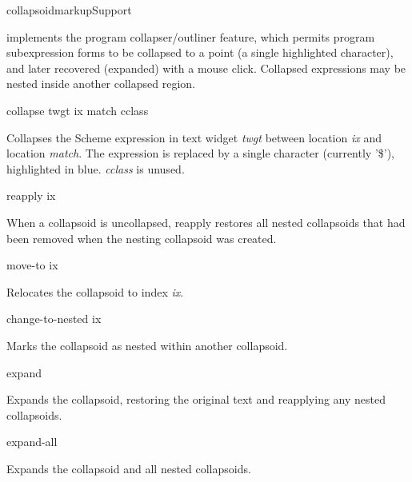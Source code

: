 \documentclass{article}
\begin{document}
\begin{class}{collapsoid}{markup}{Support}

 implements the program collapser/outliner feature,
which permits program subexpression forms to be collapsed to a point
(a single highlighted character), and later recovered (expanded) with
a mouse click.  Collapsed expressions may be nested inside another
collapsed region.

\begin{method}{collapse}{ twgt ix match cclass}{}

Collapses the Scheme expression in text widget {\sl twgt} between location
{\sl ix} and location {\sl match}.  The expression is replaced by a single
character (currently '\$'), highlighted in blue.  {\sl cclass} is unused.

\end{method}



\begin{method}{reapply}{ ix}{}

When a collapsoid is uncollapsed, reapply restores all nested
collapsoids that had been removed when the nesting collapsoid was
created.

\end{method}



\begin{method}{move-to}{ ix}{}

Relocates the collapsoid to index {\sl ix}.

\end{method}


\begin{method}{change-to-nested}{ ix}{}
	
Marks the collapsoid as nested within another collapsoid.

\end{method}


\begin{method}{expand}{}{}

Expands the collapsoid, restoring the original text and 
reapplying any nested collapsoids.

\end{method}


\begin{method}{expand-all}{}{}

Expands the collapsoid and all nested collapsoids.

\end{method}
\end{class}
\end{document}

